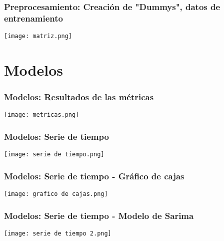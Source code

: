\documentclass{beamer}
\begin{document}


\begin{frame}
\frametitle{Preprocesamiento: Creación de "Dummys", datos de entrenamiento}
\begin{center}
    \texttt{[image: matriz.png]}
\end{center}
\end{frame}
\section{Modelos}
\begin{frame}
\frametitle{Modelos: Resultados de las métricas}
\begin{center}
    \texttt{[image: metricas.png]}
\end{center}
\end{frame}

\begin{frame}
\frametitle{Modelos: Serie de tiempo}
\begin{center}
    \texttt{[image: serie de tiempo.png]}
\end{center}

\end{frame}
\begin{frame}
\frametitle{Modelos: Serie de tiempo - Gráfico de cajas}
\begin{center}
    \texttt{[image: grafico de cajas.png]}
\end{center}

\end{frame}
\begin{frame}
\frametitle{Modelos: Serie de tiempo - Modelo de Sarima}
\begin{center}
    \texttt{[image: serie de tiempo 2.png]}
\end{center}

\end{frame}
\end{document}
